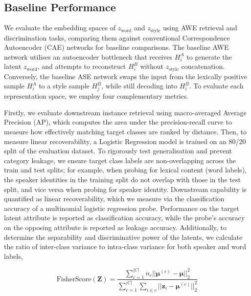 \documentclass[conference,letterpaper]{IEEEtran}
\begin{document}
\subsection{Baseline Performance}
\label{res: baseline}
We evaluate the embedding spaces of $z_{\text{word}}$ and $z_{\text{style}}$ using AWE retrieval and discrimination tasks, comparing them against conventional Correspondence Autoencoder (CAE) networks for baseline comparisons. The baseline AWE network utilises an autoencoder bottleneck that receives $H^A_i$ to generate the latent $z_{\text{word}}$, and attempts to reconstruct $H^B_i$ without $z_{\text{style}}$ concatenation. Conversely, the baseline ASE network swaps the input from the lexically positive sample $H^A_i$ to a style sample $H^B_j$, while still decoding into $H^B_i$. To evaluate each representation space, we employ four complementary metrics. 

Firstly, we evaluate downstream instance retrieval using macro-averaged Average Precision (AP), which computes the area under the precision-recall curve to measure how effectively matching target classes are ranked by distance. Then, to measure linear recoverability, a Logistic Regression model is trained on an 80/20 split of the evaluation dataset. To rigorously test generalisation and prevent category leakage, we ensure target class labels are non-overlapping across the train and test splits; for example, when probing for lexical content (word labels), the speaker identities in the training split do not overlap with those in the test split, and vice versa when probing for speaker identity. Downstream capability is quantified as linear recoverability, which we measure via the classification accuracy of a multinomial logistic regression probe. Performance on the target latent attribute is reported as classification accuracy, while the probe's accuracy on the opposing attribute is reported as leakage accuracy. Additionally, to determine the separability and discriminative power of the latents, we calculate the ratio of inter-class variance to intra-class variance for both speaker and word labels,

\vspace{-0.5cm}
    \begin{equation}
    \label{eq:fisher}
        \text{FisherScore}(\boldsymbol{Z}) = \frac{\sum^{|C|}_{c=1}n_c||\boldsymbol{\mu}^{(c)} - \boldsymbol{\mu}||^2_2}{\sum^{|C|}_{c=1}\sum_{i \in c}||\boldsymbol{z}_i - \boldsymbol{\mu}^{(c)}||^2_2}
    \end{equation} 
\vspace{-0.5cm}
\end{document}
